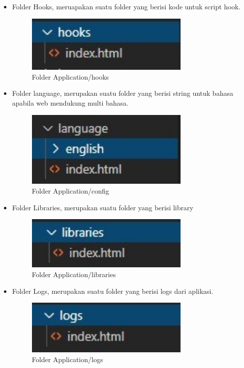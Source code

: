 \begin{itemize}
\begin{itemize}
\begin{itemize}
			\item Folder Hooks, meruapakan suatu folder yang berisi kode untuk script hook.
			\begin{figure}[H]
				\includegraphics[width=8cm]{figures/instalasi/ci20.jpg}
				\centering
				\caption{Folder Application/hooks}
			\end{figure}
			
			\item Folder language, merupakan suatu folder yang berisi string untuk bahasa apabila web mendukung multi bahasa.
			\begin{figure}[H]
				\includegraphics[width=8cm]{figures/instalasi/ci21.jpg}
				\centering
				\caption{Folder Application/config}
			\end{figure}

			\item Folder Libraries, merupakan suatu folder yang berisi library
			\begin{figure}[H]
				\includegraphics[width=8cm]{figures/instalasi/ci22.jpg}
				\centering
				\caption{Folder Application/libraries}
			\end{figure}			
	
			\item Folder Logs, merupakan suatu folder yang berisi logs dari aplikasi.
			\begin{figure}[H]
				\includegraphics[width=8cm]{figures/instalasi/ci23.jpg}
				\centering
				\caption{Folder Application/logs}
			\end{figure}	


\end{itemize}
\end{itemize}
\end{itemize}

